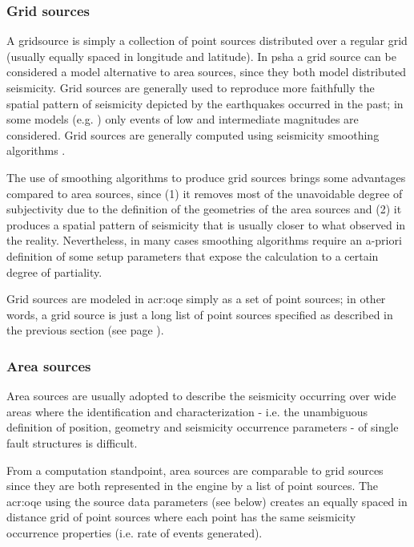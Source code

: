 \subsubsection{Grid sources}
\label{hazard:seismic_source_types:gridSources}
% 
A \gls{gridsource} is simply a collection of
point sources distributed over a regular grid (usually equally spaced in 
longitude and latitude).
%
In \gls{psha} a grid source can be considered a model alternative to area 
sources, since they both model distributed seismicity. 
%
Grid sources are generally used to reproduce more faithfully 
the spatial pattern of seismicity depicted by the earthquakes 
occurred in the past; in some models (e.g. \citet{petersen2008})
only events of low and intermediate magnitudes are considered. 
%
Grid sources are generally computed using seismicity smoothing algorithms 
\citep[][amongst many others]{frankel1995,woo1996}. 

The use of smoothing algorithms to produce grid sources brings some 
advantages compared to area sources, since (1) it removes most of the 
unavoidable degree of subjectivity due to 
the definition of the geometries of the area sources and (2) it produces
a spatial pattern of seismicity that is usually closer to what observed in 
the reality. 
Nevertheless, in many cases smoothing algorithms require an a-priori 
definition of some setup parameters that expose the calculation to a 
certain degree of partiality.

Grid sources are modeled in \gls{acr:oqe} simply as a set of point sources;
in other words, a grid source is just a long list of point sources specified 
as described in the previous section (see page 
\pageref{hazard:seismic_source_types:gridSources}).
\subsubsection{Area sources}
\label{hazard:seismic_source_types:areaSources}
%
Area sources are usually adopted to describe the seismicity occurring over 
wide areas where  
the identification and characterization - i.e. the unambiguous definition 
of position, geometry and seismicity occurrence parameters - of single 
fault structures is difficult. 

From a computation standpoint, area sources are comparable to grid sources
since they are both represented in the engine by a list of point sources.
%
The \gls{acr:oqe} using the source data parameters (see below)  
creates an equally spaced in distance grid of point sources where
each point has the same seismicity occurrence properties (i.e. rate
of events generated).

